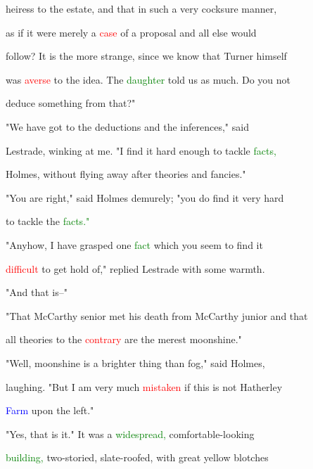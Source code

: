  heiress to the estate, and that in such a very cocksure manner,

 as if it were merely a \textcolor{red}{case} of a proposal and all else would

 follow? It is the more strange, since we know that Turner himself

 was \textcolor{red}{averse} to the idea. The \textcolor{green}{daughter} told us as much. Do you not

 deduce something from that?"



 "We have got to the deductions and the inferences," said

 Lestrade, winking at me. "I find it hard enough to \textcolor{BurntOrange}{tackle} \textcolor{green}{facts,}

 Holmes, without flying away after \textcolor{BurntOrange}{theories} and \textcolor{BurntOrange}{fancies."}



 "You are right," said Holmes demurely; "you do find it very hard

 to \textcolor{BurntOrange}{tackle} the \textcolor{green}{facts."}



 "Anyhow, I have grasped one \textcolor{green}{fact} which you seem to find it

 \textcolor{red}{difficult} to get hold of," replied Lestrade with some warmth.



 "And that is--"



 "That McCarthy senior met his \textcolor{BurntOrange}{death} from McCarthy junior and that

 all \textcolor{BurntOrange}{theories} to the \textcolor{red}{contrary} are the merest moonshine."



 "Well, moonshine is a brighter thing than fog," said Holmes,

 \textcolor{BurntOrange}{laughing.} "But I am very much \textcolor{red}{mistaken} if this is not Hatherley

 \textcolor{blue}{Farm} upon the left."



 "Yes, that is it." It was a \textcolor{green}{widespread,} comfortable-looking

 \textcolor{green}{building,} two-storied, slate-roofed, with great yellow blotches

